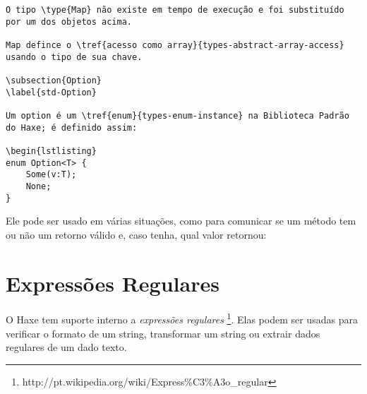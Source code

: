 \begin{lstlisting}
O tipo \type{Map} não existe em tempo de execução e foi substituído por um dos objetos acima.

Map defince o \tref{acesso como array}{types-abstract-array-access} usando o tipo de sua chave.

\subsection{Option}
\label{std-Option}

Um option é um \tref{enum}{types-enum-instance} na Biblioteca Padrão do Haxe; é definido assim:

\begin{lstlisting}
enum Option<T> {
	Some(v:T);
	None;
}
\end{lstlisting}

Ele pode ser usado em várias situações, como para comunicar se um método tem ou não um retorno válido e, caso tenha, qual valor retornou:


\section{Expressões Regulares}
\label{std-regex}

O Haxe tem suporte interno a \emph{expressões regulares} \footnote{http://pt.wikipedia.org/wiki/Express\%C3\%A3o_regular}. Elas podem ser usadas para verificar o formato de um string, transformar um string ou extrair dados regulares de um dado texto.

